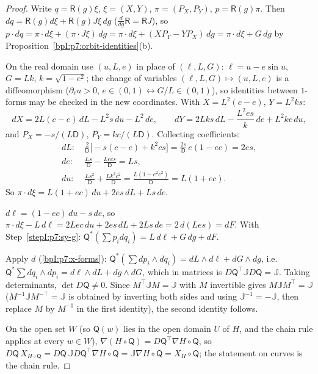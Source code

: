 \begin{proof}
\label{stepI:p7:sy-g} Write $q=\mathsf R(g)\xi$, $\xi=(X,Y)$, $\pi=(P_X,P_Y)$, $p=\mathsf R(g)\pi$. Then $dq=\mathsf R(g)d\xi+\mathsf R(g)J\xi\,dg$ ($\frac d{dg}\mathsf R=\mathsf RJ$), so
$p\cdot dq=\pi\cdot d\xi+(\pi\cdot J\xi)\,dg=\pi\cdot d\xi+(XP_Y-YP_X)\,dg=\pi\cdot d\xi+G\,dg$ by Proposition~\ref{bpI:p7:orbit-identities}(b).

\label{stepI:p7:sy-coord} On the real domain use $(u,L,e)$ in place of $(\ell,L,G)$: $\ell=u-e\sin u$, $G=Lk$, $k=\sqrt{1-e^2}$; the change of variables $(\ell,L,G)\mapsto(u,L,e)$ is a diffeomorphism ($\partial_\ell u>0$, $e\in(0,1)\leftrightarrow G/L\in(0,1)$), so identities between $1$-forms may be checked in the new coordinates. With $X=L^2(c-e)$, $Y=L^2ks$:
\[
dX=2L(c-e)\,dL-L^2s\,du-L^2\,de,\qquad dY=2Lks\,dL-\frac{L^2es}k\,de+L^2kc\,du,
\]
and $P_X=-s/(L\mathsf D)$, $P_Y=kc/(L\mathsf D)$. Collecting coefficients:
\begin{align*}
dL:&\ \tfrac2{\mathsf D}\bigl[-s(c-e)+k^2cs\bigr]=\tfrac{2s}{\mathsf D}\,e(1-ec)=2es,\\
de:&\ \tfrac{Ls}{\mathsf D}-\tfrac{Lecs}{\mathsf D}=Ls,\\
du:&\ \tfrac{L s^2}{\mathsf D}+\tfrac{Lk^2c^2}{\mathsf D}=\tfrac{L(1-e^2c^2)}{\mathsf D}=L(1+ec).
\end{align*}
So $\pi\cdot d\xi=L(1+ec)\,du+2es\,dL+Ls\,de$.

\label{stepI:p7:sy-compare} $d\ell=(1-ec)\,du-s\,de$, so $\pi\cdot d\xi-L\,d\ell=2Lec\,du+2es\,dL+2Ls\,de=2\,d(Les)=dF$. With Step~\ref{stepI:p7:sy-g}: $\mathsf Q^*(\sum p_idq_i)=L\,d\ell+G\,dg+dF$.

\label{stepI:p7:sy-ext} Apply $d$ (\ref{bpI:p7:x-forms}): $\mathsf Q^*(\sum dp_i\wedge dq_i)=dL\wedge d\ell+dG\wedge dg$, i.e.\ $\mathsf Q^*\sum dq_i\wedge dp_i=d\ell\wedge dL+dg\wedge dG$, which in matrices is $D\mathsf Q^{\top}\mathbb JD\mathsf Q=\mathbb J$. Taking determinants, $\det D\mathsf Q\ne0$.
Since $M^\top\mathbb JM=\mathbb J$ with $M$ invertible gives $M\mathbb JM^{\top}=\mathbb J$ ($M^{-1}\mathbb J M^{-\top}=\mathbb J$ is obtained by inverting both sides and using $\mathbb J^{-1}=-\mathbb J$, then replace $M$ by $M^{-1}$ in the first identity), the second identity follows.

\label{stepI:p7:sy-field} On the open set $W$ (so $\mathsf Q(w)$ lies in the open domain $U$ of $H$, and the chain rule applies at every $w\in W$), $\nabla(H\circ\mathsf Q)=D\mathsf Q^{\top}\nabla H\circ\mathsf Q$, so $D\mathsf Q\,X_{H\circ\mathsf Q}=D\mathsf Q\,\mathbb JD\mathsf Q^{\top}\nabla H\circ\mathsf Q=\mathbb J\nabla H\circ\mathsf Q=X_H\circ\mathsf Q$; the statement on curves is the chain rule.
\end{proof}

